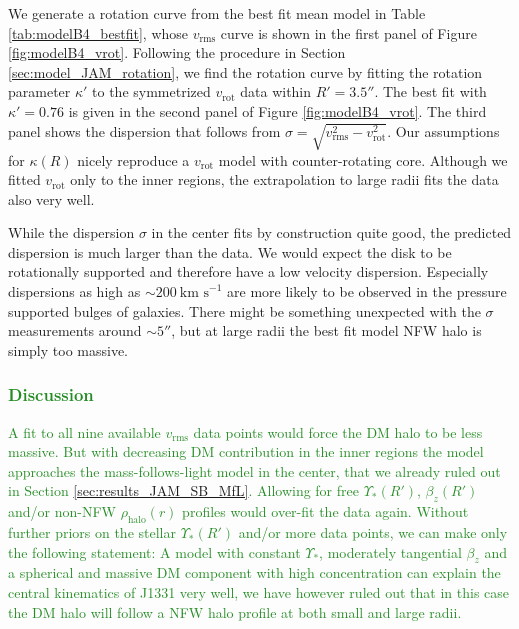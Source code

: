\documentclass[useAMS,usenatbib]{mnras}
\newcommand{\NEW}[1]{\textcolor{ForestGreen}{#1}}
\begin{document}
We generate a rotation curve from the best fit mean model in Table \ref{tab:modelB4_bestfit}, whose $v_\text{rms}$ curve is shown in the first panel of Figure \ref{fig:modelB4_vrot}. Following the procedure in Section \ref{sec:model_JAM_rotation}, we find the rotation curve by fitting the rotation parameter $\kappa'$ to the symmetrized $v_\text{rot}$ data within $R' = 3.5''$. The best fit with $\kappa' = 0.76$ is given in the second panel of Figure \ref{fig:modelB4_vrot}. The third panel shows the dispersion that follows from $\sigma = \sqrt{v_\text{rms}^2 - v_\text{rot}^2}$. Our assumptions for $\kappa(R)$ nicely reproduce a $v_\text{rot}$ model with counter-rotating core. Although we fitted $v_\text{rot}$ only to the inner regions, the extrapolation to large radii fits the data also very well.

While the dispersion $\sigma$ in the center fits by construction quite good, the predicted dispersion is much larger than the data. We would expect the disk to be rotationally supported and therefore have a low velocity dispersion. Especially dispersions as high as $\sim 200~\text{km s}^{-1}$ are more likely to be observed in the pressure supported bulges of galaxies. There might be something unexpected with the $\sigma$ measurements around $\sim 5''$, but at large radii the best fit model NFW halo is simply too massive.

\subsubsection{\NEW{Discussion}}

\NEW{A fit to all nine available $v_\text{rms}$ data points would force the DM halo to be less massive. But with decreasing DM contribution in the inner regions the model approaches the mass-follows-light model in the center, that we already ruled out in Section \ref{sec:results_JAM_SB_MfL}. Allowing for free $\Upsilon_{*}(R')$, $\beta_z(R')$ and/or non-NFW $\rho_\text{halo}(r)$ profiles would over-fit the data again. Without further priors on the stellar $\Upsilon_{*}(R')$ and/or more data points, we can make only the following statement: A model with constant $\Upsilon_*$, moderately tangential $\beta_z$ and a spherical and massive DM component with high concentration can explain the central kinematics of J1331 very well, we have however ruled out that in this case the DM halo will follow a NFW halo profile at both small and large radii.}
\end{document}
